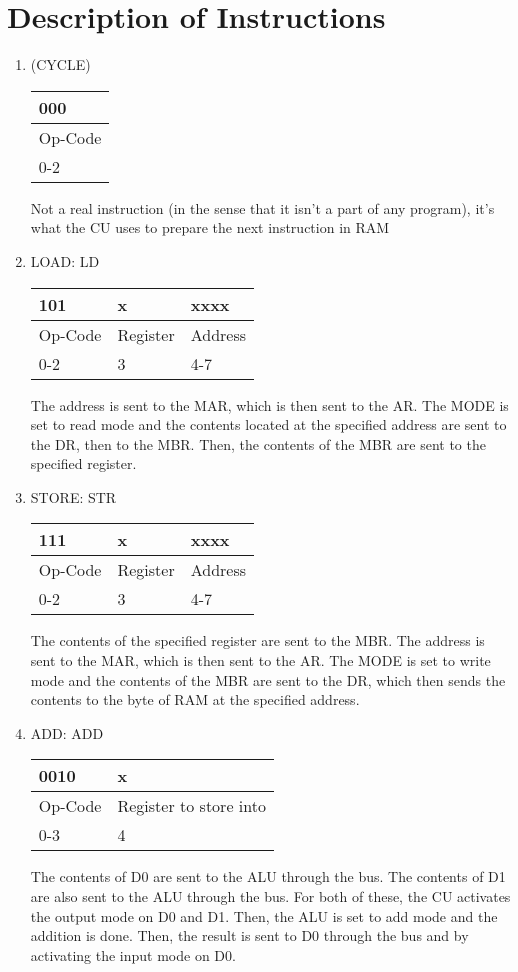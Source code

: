 \documentclass{article}
\begin{document}
	\section{Description of Instructions}
	\begin{enumerate}
\item (CYCLE)\\
\begin{tabularx}{\textwidth}{|X|}
	\hline 000
	\\ \hline Op-Code
	\\ \hline 0-2
	\\ \hline
\end{tabularx}
Not a real instruction (in the sense that it isn't a part of any program), it's what the CU uses to prepare the next instruction in RAM

\item LOAD: LD\\
  \begin{tabularx}{\textwidth}{|X|X|X|}
    \hline 101 & x & xxxx
    \\ \hline Op-Code & Register & Address
    \\ \hline 0-2 & 3 & 4-7
    \\ \hline
  \end{tabularx}
The address is sent to the MAR, which is then sent to the AR. The MODE is set to read mode and the contents located at the specified address are sent to the DR, then to the MBR. Then, the contents of the MBR are sent to the specified register.

\item STORE: STR\\
  \begin{tabularx}{\textwidth}{|X|X|X|}
    \hline 111 & x & xxxx
    \\ \hline Op-Code & Register & Address
    \\ \hline 0-2 & 3 & 4-7
    \\ \hline
  \end{tabularx}
The contents of the specified register are sent to the MBR. The address is sent to the MAR, which is then sent to the AR. The MODE is set to write mode and the contents of the MBR are sent to the DR, which then sends the contents to the byte of RAM at the specified address.

\item ADD: ADD\\
  \begin{tabularx}{\textwidth}{|X|X|}
    \hline 0010 & x
    \\ \hline Op-Code & Register to store into
    \\ \hline 0-3 & 4
    \\ \hline
  \end{tabularx}
The contents of D0 are sent to the ALU through the bus. The contents of D1 are also sent to the ALU through the bus. For both of these, the CU activates the output mode on D0 and D1. Then, the ALU is set to add mode and the addition is done. Then, the result is sent to D0 through the bus and by activating the input mode on D0.


\end{enumerate}
\end{document}

